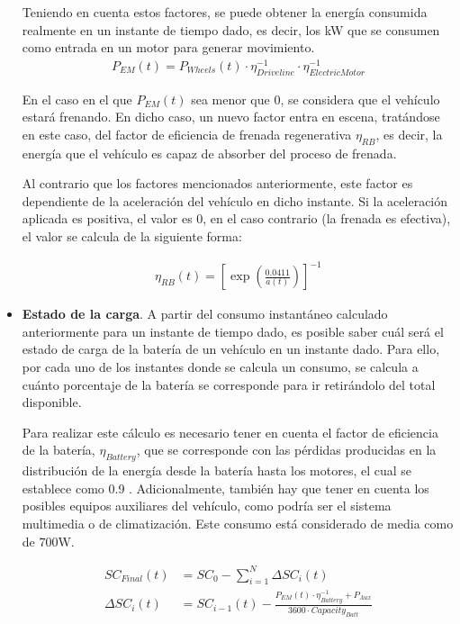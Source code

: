 \documentclass[11pt,spanish,listoffigures,listoftables]{tfgetsinf}
\begin{document}
\begin{itemize}
    Teniendo en cuenta estos factores, se puede obtener la energía consumida realmente en un instante de tiempo dado, es decir, los kW que se consumen como entrada en un motor para generar movimiento.
    \begin{align}
        P_{EM}(t) = P_{Wheels}(t) \cdot \eta_{Driveline}^{-1} \cdot \eta_{Electric Motor}^{-1}
    \end{align}
    
    En el caso en el que $P_{EM}(t)$ sea menor que 0, se considera que el vehículo estará frenando. En dicho caso, un nuevo factor entra en escena, tratándose en este caso, del factor de eficiencia de frenada regenerativa $\eta_{RB}$, es decir, la energía que el vehículo es capaz de absorber del proceso de frenada.
    
    Al contrario que los factores mencionados anteriormente, este factor es dependiente de la aceleración del vehículo en dicho instante. Si la aceleración aplicada es positiva, el valor es 0, en el caso contrario (la frenada es efectiva), el valor se calcula de la siguiente forma:
    
    \begin{align}
        \eta_{RB}(t) = \left[ \exp \left( \frac{0.0411}{a(t)} \right) \right] ^{-1}
    \end{align}
    
    \item \textbf{Estado de la carga}.
    A partir del consumo instantáneo calculado anteriormente para un instante de tiempo dado, es posible saber cuál será el estado de carga de la batería de un vehículo en un instante dado. Para ello, por cada uno de los instantes donde se calcula un consumo, se calcula a cuánto porcentaje de la batería se corresponde para ir retirándolo del total disponible. 
    
    Para realizar este cálculo es necesario tener en cuenta el factor de eficiencia de la batería, $\eta_{Battery}$, que se corresponde con las pérdidas producidas en la distribución de la energía desde la batería hasta los motores, el cual se establece como 0.9 \cite{RYDH20051957}. Adicionalmente, también hay que tener en cuenta los posibles equipos auxiliares del vehículo, como podría ser el sistema multimedia o de climatización. Este consumo está considerado de media como de 700W.
    
    \begin{align}
        SC_{Final}(t) &= SC_{0} - \sum_{i=1}^{N}{\Delta SC_{i}(t)} \\
        \Delta SC_{i}(t) &= SC_{i-1}(t) - \frac{P_{EM}(t) \cdot \eta_{Battery}^{-1} + P_{Aux}}{3600 \cdot Capacity_{Batt}}
    \end{align}
    

\end{itemize}
\end{document}
